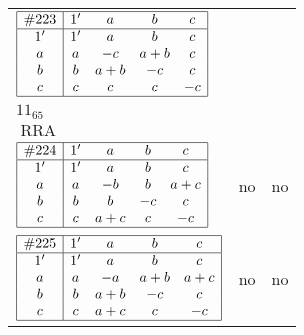\documentclass[12pt]{article}
\newcommand\RRA{\operatorname{RRA}}
\newcommand{\join}{\mathbin{+}}%
\newcommand{\id}{{1'}}%
\begin{document}
\begin{center}
\begin{longtable}{l|c|c}
$
\begin{array}{|c|cccc|} \hline
\#223 & \id & a & b & c \\ \hline
\id & \id & a & b & c \\
a & a & -c & a \join b & c \\
b & b & a \join b & -c & c \\
c & c & c & c & -c \\ \hline
\end{array}
$
 & \begin{tabular}{c} yes \\ $11_{65}$ \\ $\RRA$ \end{tabular} 
 & \adjustbox{valign=c, max height=1.6cm}{$
\left[ \begin{array}{cccccc}
\id & a & a & b & c & b \\ 
a & \id & a & a & c & b \\ 
a & a & \id & b & c & b \\ 
b & a & b & \id & c & b \\ 
c & c & c & c & \id & c \\ 
b & b & b & b & c & \id
\end{array}\right]
$}      \\[15mm]

$
\begin{array}{|c|cccc|} \hline
\#224 & \id & a & b & c \\ \hline
\id & \id & a & b & c \\
a & a & -b & b & a \join c \\
b & b & b & -c & c \\
c & c & a \join c & c & -c \\ \hline
\end{array}
$
 & no  
 & no     \\[15mm]

$
\begin{array}{|c|cccc|} \hline
\#225 & \id & a & b & c \\ \hline
\id & \id & a & b & c \\
a & a & -a & a \join b & a \join c \\
b & b & a \join b & -c & c \\
c & c & a \join c & c & -c \\ \hline
\end{array}
$
 & no  
 & no      \\[15mm]


\end{longtable}
\end{center}
\end{document}
